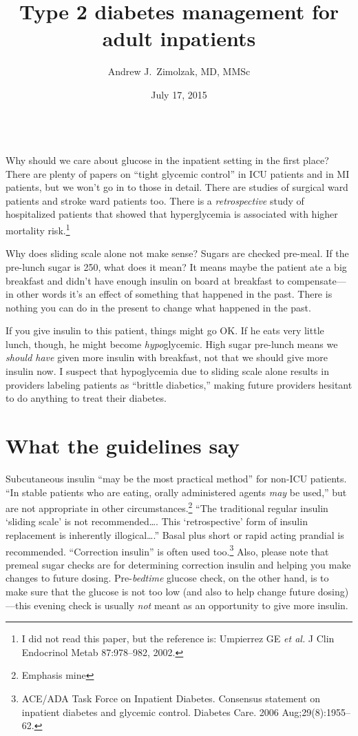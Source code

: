 \documentclass{tufte-handout}
\title{Type 2 diabetes management for adult inpatients}
\author{Andrew J.\ Zimolzak, MD, MMSc}
\date{July 17, 2015}
\begin{document}
\maketitle

~\\ %

Why should we care about glucose in the inpatient setting in the first
place? There are plenty of papers on ``tight glycemic control'' in ICU
patients and in MI patients, but we won't go in to those in
detail. There are studies of surgical ward patients and stroke ward
patients too. There is a \emph{retrospective} study of hospitalized
patients that showed that hyperglycemia is associated with higher
mortality risk.\footnote{I did not read this paper, but the reference
  is: Umpierrez GE \emph{et al.} J Clin Endocrinol Metab 87:978--982,
  2002.}

Why does sliding scale alone not make sense? Sugars are checked
pre-meal. If the pre-lunch sugar is 250, what does it mean? It means
maybe the patient ate a big breakfast and didn't have enough insulin
on board at breakfast to compensate---in other words it's an effect
of something that happened in the past. There is nothing you can do in
the present to change what happened in the past.

If you give insulin to this patient, things might go OK. If he eats
very little lunch, though, he might become \emph{hypo}glycemic. High
sugar pre-lunch means we \emph{should have} given more insulin with
breakfast, not that we should give more insulin now. I suspect that
hypoglycemia due to sliding scale alone results in providers labeling
patients as ``brittle diabetics,'' making future providers hesitant to
do anything to treat their diabetes.

\section{What the guidelines say}

Subcutaneous insulin ``may be the most practical method'' for non-ICU
patients. ``In stable patients who are eating, orally administered
agents \emph{may} be used,'' but are not appropriate in other
circumstances.\footnote{Emphasis mine} ``The traditional regular
insulin `sliding scale' is not recommended\ldots{}. This
`retrospective' form of insulin replacement is inherently
illogical\ldots{}.'' Basal plus short or rapid acting prandial is
recommended. ``Correction insulin'' is often used
too.\footnote{ACE/ADA Task Force on Inpatient Diabetes. Consensus
  statement on inpatient diabetes and glycemic control. Diabetes Care.
  2006 Aug;29(8):1955--62.} Also, please note that premeal sugar
checks are for determining correction insulin and helping you make
changes to future dosing. Pre-\emph{bedtime} glucose check, on the
other hand, is to make sure that the glucose is not too low (and also
to help change future dosing)---this evening check is usually
\emph{not} meant as an opportunity to give more insulin.
\end{document}
